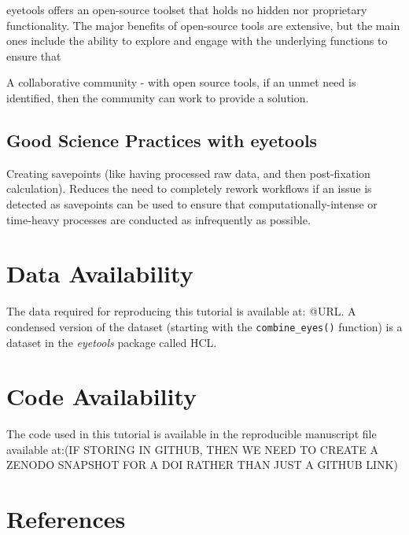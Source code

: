 \documentclass[
  man,
  floatsintext,
  longtable,
  nolmodern,
  notxfonts,
  notimes,
  colorlinks=true,linkcolor=blue,citecolor=blue,urlcolor=blue]{apa7}
\begin{document}
eyetools offers an open-source toolset that holds no hidden nor
proprietary functionality. The major benefits of open-source tools are
extensive, but the main ones include the ability to explore and engage
with the underlying functions to ensure that

A collaborative community - with open source tools, if an unmet need is
identified, then the community can work to provide a solution.

\subsection{Good Science Practices with
eyetools}\label{good-science-practices-with-eyetools}

Creating savepoints (like having processed raw data, and then
post-fixation calculation). Reduces the need to completely rework
workflows if an issue is detected as savepoints can be used to ensure
that computationally-intense or time-heavy processes are conducted as
infrequently as possible.

\section{Data Availability}\label{data-availability}

The data required for reproducing this tutorial is available at: @URL. A
condensed version of the dataset (starting with the
\texttt{combine\_eyes()} function) is a dataset in the \emph{eyetools}
package called HCL.

\section{Code Availability}\label{code-availability}

The code used in this tutorial is available in the reproducible
manuscript file available at:(IF STORING IN GITHUB, THEN WE NEED TO
CREATE A ZENODO SNAPSHOT FOR A DOI RATHER THAN JUST A GITHUB LINK)

\section{References}\label{references}
\end{document}
